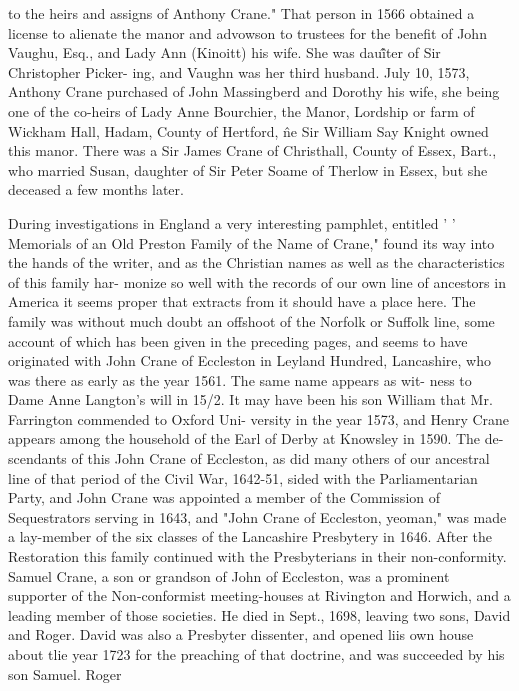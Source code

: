 \documentclass{book}
\begin{document}
to the heirs and assigns of Anthony Crane." That person in 
1566 obtained a license to alienate the manor and advowson to 
trustees for the benefit of John Vaughu, Esq., and Lady Ann 
(Kinoitt) his wife. She was dau\^\^iter of Sir Christopher Picker- 
ing, and Vaughn was her third husband. July 10, 1573, Anthony 
Crane purchased of John Massingberd and Dorothy his wife, she 
being one of the co-heirs of Lady Anne Bourchier, the Manor, 
Lordship or farm of Wickham Hall, Hadam, County of Hertford, 
\^ne Sir William Say Knight owned this manor. There was a Sir 
James Crane of Christhall, County of Essex, Bart., who married 
Susan, daughter of Sir Peter Soame of Therlow in Essex, but she 
deceased a few months later. 

During investigations in England a very interesting pamphlet, 
entitled ' ' Memorials of an Old Preston Family of the Name of 
Crane," found its way into the hands of the writer, and as the 
Christian names as well as the characteristics of this family har- 
monize so well with the records of our own line of ancestors in 
America it seems proper that extracts from it should have a 
place here. The family was without much doubt an offshoot of 
the Norfolk or Suffolk line, some account of which has been given 
in the preceding pages, and seems to have originated with John 
Crane of Eccleston in Leyland Hundred, Lancashire, who was 
there as early as the year 1561. The same name appears as wit- 
ness to Dame Anne Langton's will in 15/2. It may have been 
his son William that Mr. Farrington commended to Oxford Uni- 
versity in the year 1573, and Henry Crane appears among the 
household of the Earl of Derby at Knowsley in 1590. The de- 
scendants of this John Crane of Eccleston, as did many others of 
our ancestral line of that period of the Civil War, 1642-51, sided 
with the Parliamentarian Party, and John Crane was appointed a 
member of the Commission of Sequestrators serving in 1643, and 
"John Crane of Eccleston, yeoman," was made a lay-member of 
the six classes of the Lancashire Presbytery in 1646. After the 
Restoration this family continued with the Presbyterians in their 
non-conformity. Samuel Crane, a son or grandson of John of 
Eccleston, was a prominent supporter of the Non-conformist 
meeting-houses at Rivington and Horwich, and a leading member 
of those societies. He died in Sept., 1698, leaving two sons, 
David and Roger. David was also a Presbyter dissenter, and 
opened liis own house about tlie year 1723 for the preaching of 
that doctrine, and was succeeded by his son Samuel. Roger 
\end{document}
